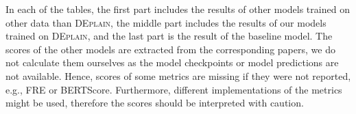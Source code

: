 \documentclass[11pt]{article}
\begin{document}
\begin{table}[h!tb]
\caption{Results 
on the test set of \emph{APA-LHA C2-A2}.
}
\label{table-results-apa-lha-a2}
\end{table}


\begin{table}[h!tb]
\caption{Results
on the test set of \emph{APA-LHA C2-B1}.
}
\label{table-results-apa-lha-b1}
\end{table}




In each of the tables, the first part includes the results of other models trained on other data than \textsc{DEplain}, the middle part includes the results of our models trained on \textsc{DEplain}, and the last part is the result of the baseline model. The scores of the other models are extracted from the corresponding papers, we do not calculate them ourselves as the model checkpoints or model predictions are not available. Hence, scores of some metrics are missing if they were not reported, e.g., FRE or BERTScore.  Furthermore, different implementations of the metrics might be used, therefore the scores should be interpreted with caution. 
\end{document}
